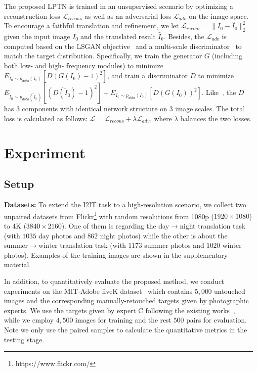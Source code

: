 \documentclass[10pt,twocolumn,letterpaper]{article}
\begin{document}
	The proposed LPTN is trained in an unsupervised scenario by optimizing a reconstruction loss $ \mathcal{L}_{recons} $ as well as an adversarial loss $ \mathcal{L}_{adv} $ on the image space. To encourage a faithful translation and refinement, we let $ \mathcal{L}_{recons} =\lVert I_0 - \hat{I}_0 \rVert_2^2 $ given the input image $I_0$ and the translated result $\hat{I}_0$. Besides, the $ \mathcal{L}_{adv} $ is computed based on the LSGAN objective~\cite{mao2017least} and a multi-scale discriminator~\cite{wang2018high} to match the target distribution. Specifically, we train the generator $G$ (including both low- and high- frequency modules) to minimize $E_{I_0\sim p_{data}(I_0)}[D(G(I_0)-1)^2]$, and train a discriminator $D$ to minimize $ E_{\widetilde{I}_0\sim p_{data}(\widetilde{I}_0)}[(D(\widetilde{I}_0)-1)^2] + E_{I_0\sim p_{data}(I_0)}[D(G(I_0))^2] $. Like~\cite{mao2017least}, the $D$ has 3 components with identical network structure on 3 image scales. The total loss is calculated as follows: $\mathcal{L} = \mathcal{L}_{recons}+\lambda\mathcal{L}_{adv}$, where $\lambda$ balances the two losses.

		
	\section{Experiment}
	
	\subsection{Setup}
	\label{tasks}
	
	\noindent\textbf{Datasets:} To extend the I2IT task to a high-resolution scenario, we collect two unpaired datasets from Flickr\footnote{https://www.flickr.com/} with random resolutions from 1080p ($1920\times 1080$) to 4K ($3840\times 2160$). One of them is regarding the day$ \rightarrow $night translation task (with $ 1035 $ day photos and $ 862 $ night photos) while the other is about the summer$ \rightarrow $winter translation task (with $ 1173 $ summer photos and $ 1020 $ winter photos). Examples of the training images are shown in the supplementary material.
	
		In addition, to quantitatively evaluate the proposed method, we conduct experiments on the MIT-Adobe fiveK dataset~\cite{bychkovsky2011learning} which contains $5,000$ untouched images and the corresponding manually-retouched targets given by photographic experts. We use the targets given by expert C following the existing works~\cite{chen2018deep}, while we employ $4,500$ images for training and the rest $500$ pairs for evaluation. Note we only use the paired samples to calculate the quantitative metrics in the testing stage.
	
\end{document}
